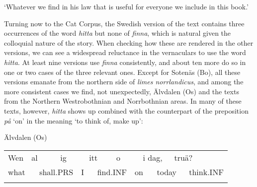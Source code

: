 \begin{styleTranslation}
‘Whatever we find in his law that is useful for everyone we include in this book.’

\end{styleTranslation}

\begin{styleBodyTextFirst}
Turning now to the Cat Corpus, the Swedish version of the text contains three occurrences of the word \textit{hitta} but none of \textit{finna}, which is natural given the colloquial nature of the story. When checking how these are rendered in the other versions, we can see a widespread reluctance in the vernaculars to use the word \textit{hitta}. At least nine versions use \textit{finna} consistently, and about ten more do so in one or two cases of the three relevant ones. Except for Sotenäs (Bo), all these versions emanate from the northern side of \textit{limes norrlandicus}, and among the more consistent cases we find, not unexpectedly, Älvdalen (Os) and the texts from the Northern Westrobothnian and Norrbothnian areas. In many of these texts, however, \textit{hitta} shows up combined with the counterpart of the preposition \textit{på} ‘on’ in the meaning ‘to think of, make up’:

\end{styleBodyTextFirst}

\begin{listWWNumileveli}
\item 

\begin{styleExample}
Älvdalen (Os)

\end{styleExample}

\end{listWWNumileveli}

\begin{tabular}{llllllllllllll}
\lsptoprule
Wen & \multicolumn{2}{l}{al

} & \multicolumn{2}{l}{ig

} & \multicolumn{2}{l}{itt

} & \multicolumn{2}{l}{o

} & \multicolumn{2}{l}{i dag,

} & \multicolumn{2}{l}{truä?

} & \\
\multicolumn{2}{l}{what

} & \multicolumn{2}{l}{shall.PRS

} & \multicolumn{2}{l}{I

} & \multicolumn{2}{l}{find.INF

} & \multicolumn{2}{l}{on

} & \multicolumn{2}{l}{today

} & \multicolumn{2}{l}{think.INF

}\\
\lspbottomrule
\end{tabular}

